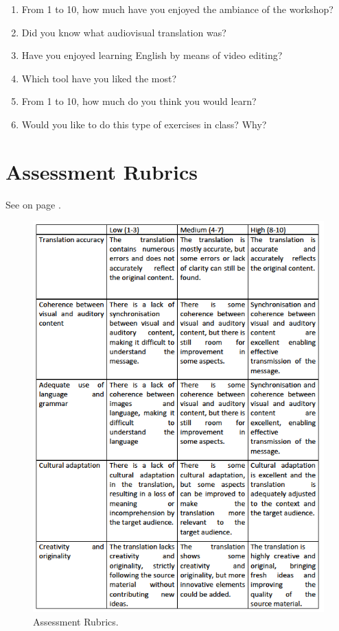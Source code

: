 \documentclass[english]{textolivre}
\begin{document}
\begin{enumerate}
  \item From 1 to 10, how much have you enjoyed the ambiance of the workshop?
  \item Did you know what audiovisual translation was?
  \item Have you enjoyed learning English by means of video editing?
  \item Which tool have you liked the most?
  \item From 1 to 10, how much do you think you would learn?
  \item Would you like to do this type of exercises in class? Why?
\end{enumerate}

\section{Assessment Rubrics}\label{annex-02}

See  on page \pageref{fig-annex}.

\begin{figure}[h!]
  \centering
  \includegraphics[width=\textwidth]{figure-annex.png}
  \caption{Assessment Rubrics.}
  \label{fig-annex}
\end{figure}
\end{document}
